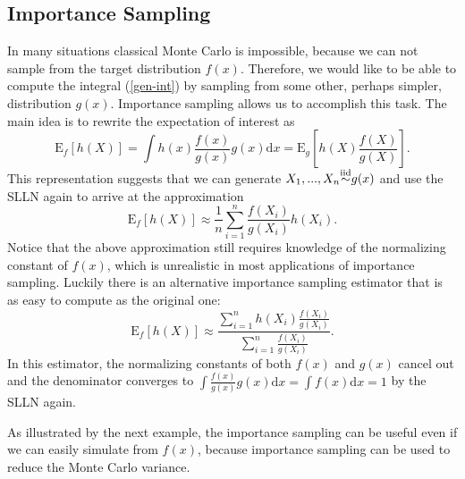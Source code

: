 \documentclass[11pt]{article}\usepackage[]{graphicx}\usepackage[]{color}
\numberwithin{algorithm}{section}
\theoremstyle{remark}
\theoremstyle{definition}
\begin{document}
\subsection*{Importance Sampling}
In many situations classical Monte Carlo is impossible, because we can not sample from the target
distribution $f(x)$. Therefore, we would like to be able to compute the integral (\ref{gen-int})
by sampling from some other, perhaps simpler, distribution $g(x)$. Importance sampling allows us to 
accomplish this task. The main idea is to rewrite the expectation of interest as
\begin{equation*}
  \text{E}_f[h(X)]=  
  \int h(x)\frac{f(x)}{g(x)}g(x)\text{d}x = \text{E}_g\left[h(X) \frac{f(X)}{g(X)}\right].  
\end{equation*}
This representation suggests that we can generate $X_1,...,X_n {\buildrel \text{iid} \over \sim} g(x)$ and 
use the SLLN again to arrive at the approximation
\begin{equation*}
  \text{E}_f[h(X)] \approx \frac{1}{n}\sum_{i = 1}^n \frac{f(X_i)}{g(X_i)}h(X_i).
\end{equation*}
Notice that the above approximation still requires knowledge of the normalizing constant of $f(x)$, which
is unrealistic in most applications of importance sampling. Luckily there is an alternative importance
sampling estimator that is as easy to compute as the original one:
\begin{equation*}
  \text{E}_f[h(X)] \approx  \frac{\sum_{i=1}^n h(X_i) \frac{f(X_i)}{g(X_i)}}{\sum_{i=1}^n \frac{f(X_i)}{g(X_i)}}.  
\end{equation*}
In this estimator, the normalizing constants of both $f(x)$ and $g(x)$ cancel out and the denominator
converges to $\int \frac{f(x)}{g(x)}g(x) \text{d}x = \int f(x)\text{d}x = 1$ by the SLLN again.
\par
As illustrated by the next example, the importance sampling can be useful even if we can easily 
simulate from $f(x)$, because importance sampling can be used to reduce the Monte Carlo variance.
\end{document}
